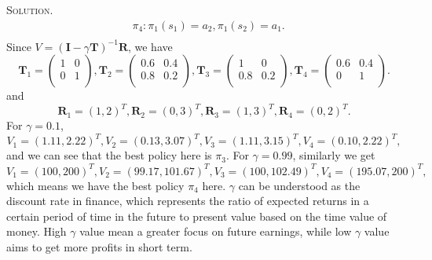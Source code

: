 \documentclass[12pt, a4paper, oneside]{ctexart}
\newenvironment{solution}{\par\noindent\textsc{Solution. }}{\\\par}
\begin{document}
\begin{solution}
\begin{align*}
	& \pi_4: \pi_1(s_1) = a_2, \pi_1(s_2) = a_1. \\
	\end{align*}
	Since $V = (\mathbf{I} - \gamma\mathbf{T})^{-1}\mathbf{R}$, we have
	\[
	\mathbf{T}_1 = 
		\begin{pmatrix}
		1 & 0 \\
		0 & 1 \\
		\end{pmatrix},
	\mathbf{T}_2 = 
		\begin{pmatrix}
		0.6 & 0.4 \\
		0.8 & 0.2 \\
		\end{pmatrix},
	\mathbf{T}_3 = 
		\begin{pmatrix}
		1 & 0 \\
		0.8 & 0.2 \\
		\end{pmatrix},
	\mathbf{T}_4 = 
		\begin{pmatrix}
		0.6 & 0.4 \\
		0 & 1 \\
		\end{pmatrix}.
	\]
	and
	\[
	\mathbf{R}_1 = (1, 2)^T,
	\mathbf{R}_2 = (0, 3)^T,
	\mathbf{R}_3 = (1, 3)^T,
	\mathbf{R}_4 = (0, 2)^T.
	\]
	For $\gamma = 0.1$,
	\[
	V_1 = (1.11, 2.22)^T,
	V_2 = (0.13, 3.07)^T,
	V_3 = (1.11, 3.15)^T,
	V_4 = (0.10, 2.22)^T,
	\]
	and we can see that the best policy here is $\pi_3$. \newline
	For $\gamma = 0.99$, similarly we get
	\[
	V_1 = (100, 200)^T,
	V_2 = (99.17, 101.67)^T,
	V_3 = (100, 102.49)^T,
	V_4 = (195.07, 200)^T,
	\]
	which means we have the best policy $\pi_4$ here. \newline
	$\gamma$ can be understood as the discount rate in finance, which represents the ratio of expected returns in a certain period of time in the future to present value based on the time value of money. High $\gamma$ value mean a greater focus on future earnings, while low $\gamma$ value aims to get more profits in short term.
\end{solution}
\end{document}

